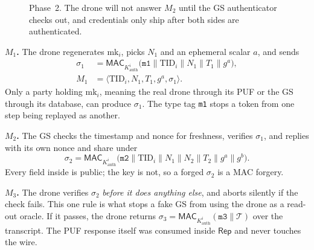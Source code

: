 \documentclass[conference]{IEEEtran}
\begin{document}
\begin{figure}[H]
\centering
{}
\caption{Phase~2. The drone will not answer $M_2$ until the GS authenticator
checks out, and credentials only ship after both sides are authenticated.}
\label{fig:phase2}
\end{figure}

\textbf{$M_1$.} The drone regenerates $\text{mk}_i$, picks $N_1$ and an
ephemeral scalar $a$, and sends
\begin{align}
\sigma_1 &= \mathsf{MAC}_{K^{i}_{\text{auth}}}\big(\texttt{m1} \| \text{TID}_i \| N_1 \| T_1 \| g^{a}\big),\\
M_1 &= \langle \text{TID}_i, N_1, T_1, g^{a}, \sigma_1\rangle.
\end{align}
Only a party holding $\text{mk}_i$, meaning the real drone through its PUF or
the GS through its database, can produce $\sigma_1$. The type tag \texttt{m1}
stops a token from one step being replayed as another.

\textbf{$M_2$.} The GS checks the timestamp and nonce for freshness, verifies
$\sigma_1$, and replies with its own nonce and share under
\begin{equation}
\sigma_2 = \mathsf{MAC}_{K^{i}_{\text{auth}}}\big(\texttt{m2} \| \text{TID}_i \| N_1 \| N_2 \| T_2 \| g^{a} \| g^{b}\big).
\end{equation}
Every field inside is public; the key is not, so a forged $\sigma_2$ is a MAC
forgery.

\textbf{$M_3$.} The drone verifies $\sigma_2$ \emph{before it does anything
else}, and aborts silently if the check fails. This one rule is what stops a
fake GS from using the drone as a read-out oracle. If it passes, the drone
returns $\sigma_3 = \mathsf{MAC}_{K^{i}_{\text{auth}}}(\texttt{m3} \| \mathcal{T})$
over the transcript. The PUF response itself was consumed inside $\mathsf{Rep}$
and never touches the wire.
\end{document}
